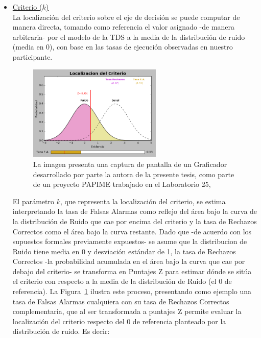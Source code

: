 \begin{itemize}


\item \underline{Criterio ($k$)}\\

La localización del criterio sobre el eje de decisión se puede computar de manera directa, tomando como referencia el valor asignado -de manera arbitraria- por el modelo de la TDS a la media de la distribución de ruido (media en 0), con base en las tasas de ejecución observadas en nuestro participante. \\

\begin{figure}[th]
\centering
\includegraphics[width=0.60\textwidth]{Figures/Graficador_Criterio} 
\caption[Estimación del criterio con base en las Falsas Alarmas]{La imagen presenta una captura de pantalla de un Graficador desarrollado por parte la autora de la presente tesis, como parte de un proyecto PAPIME trabajado en el Laboratorio 25, \parencite{PAPIME}}
\label{fig:Graf_Criterio}
\end{figure}

El parámetro $k$, que representa la localización del criterio, se estima interpretando la tasa de Falsas Alarmas como reflejo del área bajo la curva de la distribución de Ruido que cae por encima del criterio y la tasa de Rechazos Correctos como el área bajo la curva restante. Dado que -de acuerdo con los supuestos formales previamente expuestos- se asume que la distribucion de Ruido tiene media en 0 y desviación estándar de 1, la tasa de Rechazos Correctos -la probabilidad acumulada en el área bajo la curva que cae por debajo del criterio- se transforma en Puntajes Z para estimar dónde se sitúa el criterio con respecto a la media de la distribución de Ruido (el 0 de referencia). La Figura~\ref{fig:Graf_Criterio} ilustra este proceso, presentando como ejemplo una tasa de Falsas Alarmas cualquiera con su tasa de Rechazos Correctos complementaria, que al ser transformada a puntajes Z permite evaluar la localización del criterio respecto del 0 de referencia planteado por la distribución de ruido. Es decir:\\


\end{itemize}
